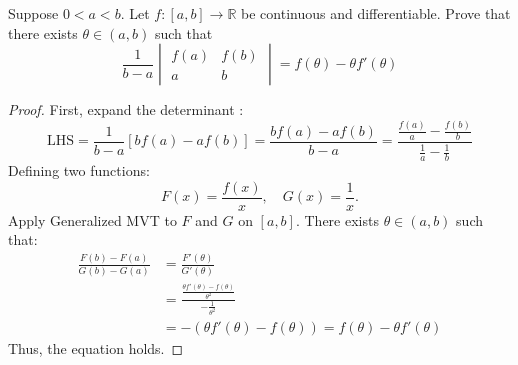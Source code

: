\documentclass[
	UTF-8,
	11pt, %
	a4paper, %
]{LegrandOrangeBook}
\begin{document}
    \begin{example}
    Suppose $0 < a < b$. Let $f: [a, b] \to \mathbb{R}$ be continuous and differentiable. Prove that there exists $\theta \in (a, b)$ such that
    \[ \frac{1}{b - a} \begin{vmatrix} f(a) & f(b) \\ a & b \end{vmatrix} = f(\theta) - \theta f'(\theta) \]
    \begin{proof}
        First, expand the determinant :
        \[ \text{LHS} = \frac{1}{b - a} [b f(a) - a f(b)] = \frac{b f(a) - a f(b)}{b - a} = \frac{\frac{f(a)}{a} - \frac{f(b)}{b}}{\frac{1}{a} - \frac{1}{b}} \]
        Defining two functions:
        \[ F(x) = \frac{f(x)}{x}, \quad G(x) = \frac{1}{x}. \]
        Apply Generalized MVT to $F$ and $G$ on $[a, b]$. There exists $\theta \in (a, b)$ such that:
        $$
        \begin{aligned}
            \frac{F(b) - F(a)}{G(b) - G(a)} &= \frac{F'(\theta)}{G'(\theta)} \\
            &= \frac{\frac{\theta f'(\theta) - f(\theta)}{\theta^2}}{-\frac{1}{\theta^2}} \\
            &= -(\theta f'(\theta) - f(\theta)) = f(\theta) - \theta f'(\theta)
        \end{aligned}
        $$
        Thus, the equation holds.
    \end{proof}
    \end{example}
    
\end{document}
